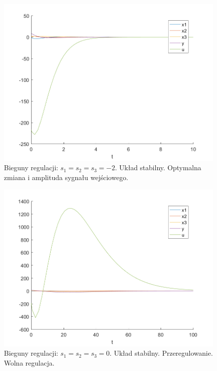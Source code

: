 \documentclass{article}
\begin{document}
\begin{figure}[H]
\centering
\includegraphics[width=0.9\linewidth]{z6_-2}
\caption{Bieguny regulacji: $s_1 = s_2 = s_3 = -2$. Układ stabilny. Optymalna zmiana i amplituda sygnału wejściowego.}
\label{fig:z6-2}
\end{figure}

\begin{figure}[H]
\centering
\includegraphics[width=0.9\linewidth]{z6_-01}
\caption{Bieguny regulacji: $s_1 = s_2 = s_3 = 0$. Układ stabilny. Przeregulowanie. Wolna regulacja.}
\label{fig:z6-01}
\end{figure}
\end{document}
